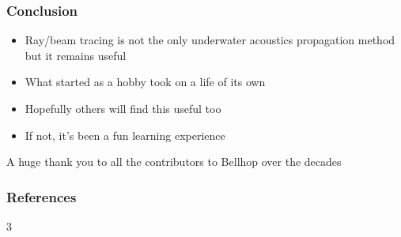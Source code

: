 \documentclass[10pt]{beamer}
\begin{document}
\begin{frame}
\frametitle{Conclusion}
\begin{itemize}
\item Ray/beam tracing is not the only underwater acoustics propagation method but it remains useful
\item What started as a hobby took on a life of its own
\item Hopefully others will find this useful too
\item If not, it's been a fun learning experience
\end{itemize}
\bigskip
A huge thank you to all the contributors to Bellhop over the decades
\end{frame}

\begin{frame}
\frametitle{References}
\begin{multicols}{3}
\printbibliography
\end{multicols}
\end{frame}
\end{document}
